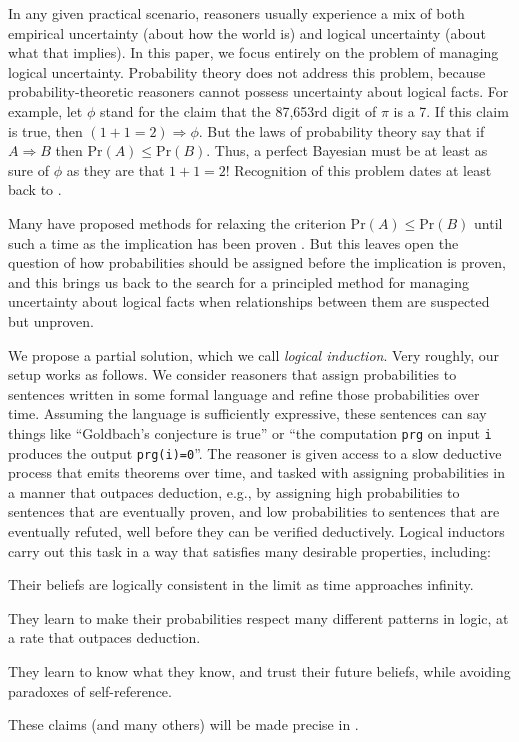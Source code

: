 \documentclass[authordate,onecolumn,noenvironments]{miri-tech-article}
\numberwithin{equation}{subsection}
\newcommand{\Implies}{\Rightarrow}
\newcommand{\Bayesian}{\mathrm{Pr}}
\begin{document}
In any given practical scenario, reasoners usually experience a mix of both empirical uncertainty (about how the world is) and logical uncertainty (about what that implies). In this paper, we focus entirely on the problem of managing logical uncertainty. Probability theory does not address this problem, because probability-theoretic reasoners cannot possess uncertainty about logical facts. For example, let $\phi$ stand for the claim that the 87,653rd digit of $\pi$ is a 7. If this claim is true, then $(1+1=2) \Implies \phi$. But the laws of probability theory say that if $A \Implies B$ then $\Bayesian(A) \le \Bayesian(B)$. Thus, a perfect Bayesian must be at least as sure of $\phi$ as they are that $1+1=2$! Recognition of this problem dates at least back to \citet{Good:1950:weighing}.

Many have proposed methods for relaxing the criterion $\Bayesian(A) \le \Bayesian(B)$ until such a time as the implication has been proven . But this leaves open the question of how probabilities should be assigned before the implication is proven, and this brings us back to the search for a principled method for managing uncertainty about logical facts when relationships between them are suspected but unproven.

We propose a partial solution, which we call \emph{logical induction}. Very roughly, our setup works as follows. We consider reasoners that assign probabilities to sentences written in some formal language and refine those probabilities over time. Assuming the language is sufficiently expressive, these sentences can say things like ``Goldbach's conjecture is true'' or ``the computation \texttt{prg} on input \texttt{i} produces the output \texttt{prg(i)=0}''. The reasoner is given access to a slow deductive process that emits theorems over time, and tasked with assigning probabilities in a manner that outpaces deduction, e.g., by assigning high probabilities to sentences that are eventually proven, and low probabilities to sentences that are eventually refuted, well before they can be verified deductively. Logical inductors carry out this task in a way that satisfies many desirable properties, including:
\begin{enumerate*}
  \item Their beliefs are logically consistent in the limit as time approaches infinity.
  \item They learn to make their probabilities respect many different patterns in logic, at a rate that outpaces deduction.
  \item They learn to know what they know, and trust their future beliefs, while avoiding paradoxes of self-reference.
\end{enumerate*}
These claims (and many others) will be made precise in .
\end{document}
